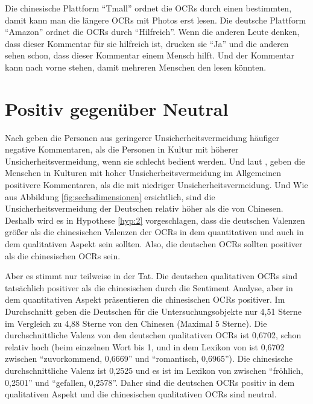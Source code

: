 Die chinesische Plattform ``Tmall'' ordnet die \ac{OCRs} durch einen bestimmten, damit kann man die längere \ac{OCRs} mit Photos erst lesen. Die deutsche Plattform ``Amazon'' ordnet die \ac{OCRs} durch ``Hilfreich''. Wenn die anderen Leute denken, dass dieser Kommentar für sie hilfreich ist, drucken sie ``Ja'' und die anderen sehen schon, dass dieser Kommentar einem Mensch hilft. Und der Kommentar kann nach vorne stehen, damit mehreren Menschen den lesen könnten.
\section{Positiv gegenüber Neutral} \label{sec:diskussion:2}
Nach \citet{liu2001relationships} geben die Personen aus geringerer Unsicherheitsvermeidung häufiger negative Kommentaren, als die Personen in Kultur mit höherer Unsicherheitsvermeidung, wenn sie schlecht bedient werden. Und laut \citet{donthu1998cultural}, geben die Menschen in Kulturen mit hoher Unsicherheitsvermeidung im Allgemeinen positivere Kommentaren, als die mit niedriger Unsicherheitsvermeidung. Und Wie aus Abbildung \ref{fig:sechsdimensionen} ersichtlich, sind die Unsicherheitsvermeidung der Deutschen relativ höher als die von Chinesen. Deshalb wird es in Hypothese \ref{hyp:2} vorgeschlagen, dass die deutschen Valenzen größer als die chinesischen Valenzen der \ac{OCRs} in dem quantitativen und auch in dem qualitativen Aspekt sein sollten. Also, die deutschen \ac{OCRs} sollten positiver als die chinesischen \ac{OCRs} sein.

Aber es stimmt nur teilweise in der Tat. Die deutschen qualitativen \ac{OCRs} sind tatsächlich positiver als die chinesischen durch die Sentiment Analyse, aber in dem quantitativen Aspekt präsentieren die chinesischen \ac{OCRs} positiver. Im Durchschnitt geben die Deutschen für die Untersuchungsobjekte nur 4,51 Sterne im Vergleich zu 4,88 Sterne von den Chinesen (Maximal 5 Sterne). Die durchschnittliche Valenz von den deutschen qualitativen \ac{OCRs} ist 0,6702, schon relativ hoch (beim einzelnen Wort bis 1, und in dem Lexikon von \citet{Remus2010} ist 0,6702 zwischen ``zuvorkommend, 0,6669'' und ``romantisch, 0,6965''). Die chinesische durchschnittliche Valenz ist 0,2525 und es ist im Lexikon von \citet{Remus2010} zwischen ``fröhlich, 0,2501'' und ``gefallen, 0,2578''. Daher sind die deutschen \ac{OCRs} positiv in dem qualitativen Aspekt und die chinesischen qualitativen \ac{OCRs} sind neutral.

